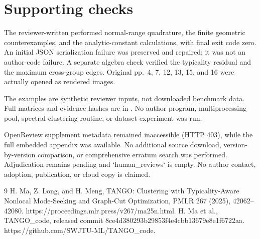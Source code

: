 \documentclass[10pt]{article}
\begin{document}
\section*{Supporting checks}
The reviewer-written performed normal-range quadrature, the finite geometric counterexamples, and the analytic-constant calculations, with final exit code zero. An initial JSON serialization failure was preserved and repaired; it was not an author-code failure. A separate algebra check verified the typicality residual and the maximum cross-group edges. Original pp. 4, 7, 12, 13, 15, and 16 were actually opened as rendered images.\par
The examples are synthetic reviewer inputs, not downloaded benchmark data. Full matrices and evidence hashes are in . No author program, multiprocessing pool, spectral-clustering routine, or dataset experiment was run.\par
OpenReview supplement metadata remained inaccessible (HTTP 403), while the full embedded appendix was available. No additional source download, version-by-version comparison, or comprehensive erratum search was performed. Adjudication remains pending and `human\_reviews` is empty. No author contact, adoption, publication, or cloud copy is claimed.\par
9 H. Ma, Z. Long, and H. Meng, TANGO: Clustering with Typicality-Aware Nonlocal Mode-Seeking and Graph-Cut Optimization, PMLR 267 (2025), 42062–42080. https://proceedings.mlr.press/v267/ma25n.html. H. Ma et al., TANGO\_code, released commit 8ce4d380293b29853f4e4cbb13679e8e1f6722aa. https://github.com/SWJTU-ML/TANGO\_code.\par
\end{document}
